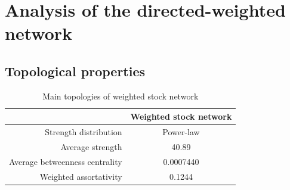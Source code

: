 \section{Analysis of the directed-weighted network}
\subsection{Topological properties}

\begin{table}
	\begin{center}
		\begin{tabular}{|r|c|}\hline\hline
			&Weighted stock network\\\hline
			Strength distribution&Power-law\\
			Average strength&40.89\\ %
			Average betweenness centrality&0.0007440\\
			Weighted assortativity&0.1244\\ %
			\hline\hline
		\end{tabular}
	\end{center}
	\caption{Main topologies of weighted stock network}\label{tab:weighted}
\end{table}

